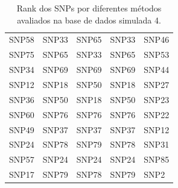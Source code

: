 \begin{table}[ht]
\begin{tabular}{lllll}
  SNP58 & SNP33 & SNP65 & SNP33 & SNP46 \\ 
  SNP75 & SNP65 & SNP33 & SNP65 & SNP53 \\ 
  SNP34 & SNP69 & SNP69 & SNP69 & SNP44 \\ 
  SNP12 & SNP18 & SNP50 & SNP18 & SNP27 \\ 
  SNP36 & SNP50 & SNP18 & SNP50 & SNP23 \\ 
  SNP60 & SNP76 & SNP76 & SNP76 & SNP22 \\ 
  SNP49 & SNP37 & SNP37 & SNP37 & SNP12 \\ 
  SNP24 & SNP78 & SNP79 & SNP78 & SNP31 \\ 
  SNP57 & SNP24 & SNP24 & SNP24 & SNP85 \\ 
  SNP17 & SNP79 & SNP78 & SNP79 & SNP2 \\ 
   \hline
\end{tabular}
\caption{Rank dos SNPs por diferentes métodos avaliados na base de dados simulada 4.} 
\label{tab:ranks}
\end{table}
